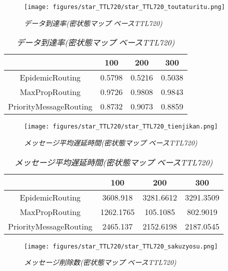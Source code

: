 \documentclass[11pt]{icsthesis}
\begin{document}
\begin{figure}[h]
\centering
\texttt{[image: figures/star\_TTL720/star\_TTL720\_toutaturitu.png]}
\caption[]{\it{データ到達率(密状態マップ ベースTTL720)}}
\label{kamituttl720deliveryprobgraph}
\end{figure}

\begin{table}[H]
 \begin{center}
      \caption[]{\it{データ到達率(密状態マップ ベースTTL720)}}
      \label{kamituttl720deliveryprob}
      \begin{tabular}{|c|c|c|c|}
\hline
&100&200&300\\
\hline
EpidemicRouting&0.5798&0.5216&0.5038\\
\hline
MaxPropRouting&0.9726&0.9808&0.9843\\
\hline
PriorityMessageRouting&0.8732&0.9073&0.8859\\
\hline
      \end{tabular}
    \end{center}
\end{table}

\newpage

\begin{figure}[h]
\centering
\texttt{[image: figures/star\_TTL720/star\_TTL720\_tienjikan.png]}
\caption[]{\it{メッセージ平均遅延時間(密状態マップ ベースTTL720)}}
\label{kamituttl720latencyavggraph}
\end{figure}

\begin{table}[H]
	\begin{center}
      \caption[]{\it{メッセージ平均遅延時間(密状態マップ ベースTTL720)}}
      \label{kamituttl720latencyavg}
      \begin{tabular}{|c|c|c|c|}
				\hline
				&100&200&300\\
				\hline
				EpidemicRouting&3608.918&3281.6612&3291.3509\\
				\hline
				MaxPropRouting&1262.1765&105.1085&802.9019\\
				\hline
				PriorityMessageRouting&2465.137&2152.6198&2187.0545\\
				\hline
			\end{tabular}
			\end{center}
\end{table}

\begin{figure}[h]
\centering
\texttt{[image: figures/star\_TTL720/star\_TTL720\_sakuzyosu.png]}
\caption[]{\it{メッセージ削除数(密状態マップ ベースTTL720)}}
\label{kamituttl720droppedgraph}
\end{figure}
\end{document}
